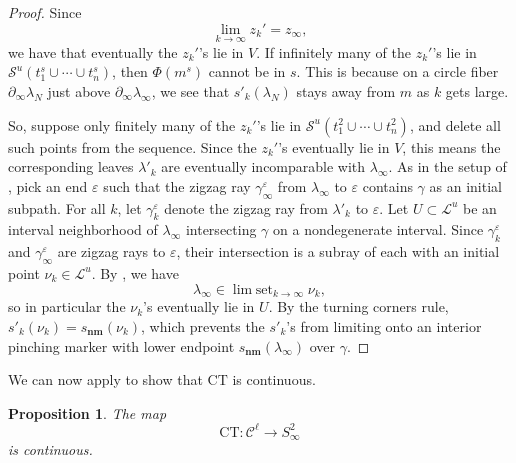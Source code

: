 \documentclass[11pt]{amsart}
\renewcommand{\l}{\lambda}
\newcommand{\mc}{\mathcal}
\newcommand{\ct}{\mathrm{CT}}
\newcommand{\snm}{s_\mathbf{nm}}
\newcommand{\vep}{\varepsilon}
\DeclareMathOperator*{\limset}{\mathrm{lim}\; \mathrm{set}}
\numberwithin{equation}{section}
\newtheorem{proposition}[equation]{Proposition}
\theoremstyle{definition}
\begin{document}
\begin{proof}
	Since 
	\[
	\lim_{k\to\infty}z_k'=z_\infty,
	\]
	we have that eventually the $z_k'$'s lie in $V$. If infinitely many of the $z_k'$'s lie in $\mc S^u(t^s_1\cup\cdots\cup t^s_n)$, then $\Phi(m^s)$ cannot be in $s$. This is because on a circle fiber $\partial_\infty\l_{N}$ just above $\partial_\infty\l_\infty$, we see that $s'_k(\l_N)$ stays away from $m$ as $k$ gets large.
	
	So, suppose only finitely many of the $z_k'$'s lie in $\mc S^u(t^2_1\cup\cdots\cup t^2_n)$, and delete all such points from the sequence. Since the $z_k'$'s eventually lie in $V$, this means the corresponding leaves $\l'_k$ are eventually incomparable with $\l_\infty$. As in the setup of , pick an end $\vep$ such that the zigzag ray $\gamma_\infty^\vep$ from $\l_\infty$ to $\vep$ contains $\gamma$ as an initial subpath. For all $k$, let $\gamma_k^\vep$ denote the zigzag ray from $\l'_k$ to $\vep$. Let $U\subset\mc L^u$ be an interval neighborhood of $\l_\infty$ intersecting $\gamma$ on a nondegenerate interval. Since $\gamma^\vep_k$ and $\gamma^\vep_\infty$ are zigzag rays to $\vep$, their intersection is a subray of each with an initial point $\nu_k\in\mc L^u$. By , we have 
	\[
	\l_\infty\in\limset_{k\to\infty}\nu_k,
	\]
	so in particular the $\nu_k$'s eventually lie in $U$. By the turning corners rule, $s'_k(\nu_k)=\snm(\nu_k)$, which prevents the $s'_k$'s from limiting onto an interior pinching marker with lower endpoint $\snm(\l_\infty)$ over $\gamma$.
\end{proof}


We can now apply  to show that $\ct$ is continuous.

\begin{proposition}\label{prop:ct_cts}
	The map 
	\[
	\ct\colon\mc C^\ell\to S^2_\infty
	\] 
	is continuous.
\end{proposition}
\end{document}
